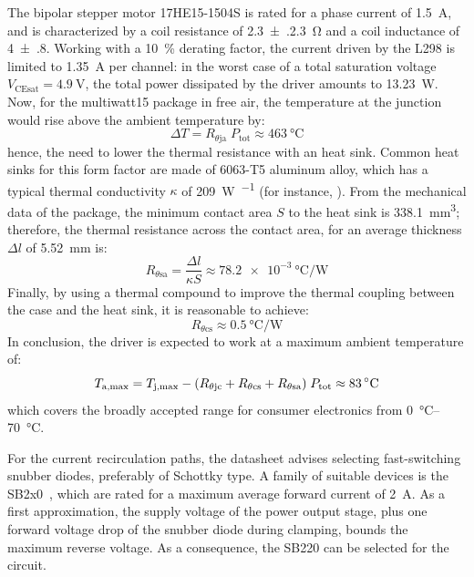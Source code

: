 \documentclass[]{article}
\begin{document}
The bipolar stepper motor 17HE15-1504S is rated for a phase current of \qty{1.5}{\A}, and is characterized by a coil resistance of \qty{2.3(.23)}{\ohm} and a coil inductance of \qty{4(.8)}{\mH}. Working with a \qty{10}{\percent} derating factor, the current driven by the L298 is limited to \qty{1.35}{\A} per channel: in the worst case of a total saturation voltage $V_\text{CEsat} = \qty{4.9}{\V}$, the total power dissipated by the driver amounts to \qty{13.23}{\W}.
Now, for the multiwatt15 package in free air, the temperature at the junction would rise above the ambient temperature by:
\[
    \Delta T = R_{\theta\text{ja}}\;P_\text{tot} \approx \qty{463}{\celsius}
\]
hence, the need to lower the thermal resistance with an heat sink. Common heat sinks for this form factor are made of 6063-T5 aluminum alloy, which has a typical thermal conductivity $\kappa$ of \qty{209}{\W\per{\m\kelvin}} (for instance, \cite{xsd_hs}). From the mechanical data of the package, the minimum contact area $S$ to the heat sink is \qty{338.1}{\milli\meter^3}; therefore, the thermal resistance across the contact area, for an average thickness $\Delta l$ of \qty{5.52}{\milli\m} is:
\[
    R_{\theta\text{sa}} = \frac{\Delta l}{\kappa S} \approx \qty{78.2e-3}{\celsius\per\W}
\]
Finally, by using a thermal compound to improve the thermal coupling between the case and the heat sink, it is reasonable to achieve:
\[
    R_{\theta\text{cs}} \approx \qty{0.5}{\celsius\per\W}
\]
In conclusion, the driver is expected to work at a maximum ambient temperature of:
\[
    T_{\text{a,max}} = T_{\text{j,max}} 
        - \pqty*{R_{\theta\text{jc}}+R_{\theta\text{cs}}+R_{\theta\text{sa}}}
        \;P_\text{tot} \approx \qty{83}{\celsius}
\]
which covers the broadly accepted range for consumer electronics from \qtyrange{0}{70}{\celsius}.

For the current recirculation paths, the datasheet advises selecting fast-switching snubber diodes, preferably of Schottky type. A family of suitable devices is the SB2x0~\cite{sb260}, which are rated for a maximum average forward current of \qty{2}{\A}. As a first approximation, the supply voltage of the power output stage, plus one forward voltage drop of the snubber diode during clamping, bounds the maximum reverse voltage. As a consequence, the SB220 can be selected for the circuit.
\end{document}
